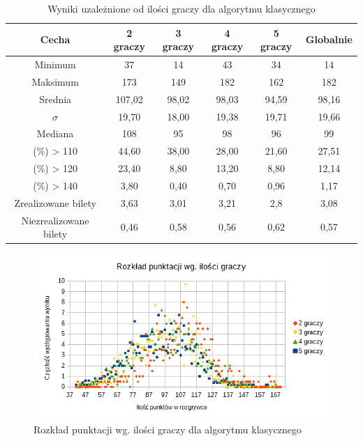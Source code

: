 \documentclass[12pt, oneside]{report}
\begin{document}
\begin{table}[h]
	\begin{center}
		\begin{tabular}{| c | c | c | c | c | c |} \hline
			Cecha & 2 graczy & 3 graczy & 4 graczy & 5 graczy & Globalnie \\ \hline
			Minimum & 37 & 14 & 43 & 34 & 14 \\ \hline
			Maksimum & 173 & 149 & 182 & 162 & 182 \\ \hline
			Srednia & 107,02 & 98,02 & 98,03 & 94,59 & 98,16 \\ \hline
			\begin{math}
				\sigma
			\end{math}
			 & 19,70 & 18,00 & 19,38 & 19,71 & 19,66 \\ \hline
			Mediana & 108 & 95 & 98 & 96 & 99 \\ \hline
			(\%) > 110 & 44,60 & 38,00 & 28,00 & 21,60 & 27,51 \\ \hline
			(\%) > 120 & 23,40 & 8,80 & 13,20 & 8,80 & 12,14 \\ \hline
			(\%) > 140 & 3,80 & 0,40 & 0,70 & 0,96 & 1,17 \\ \hline
			Zrealizowane bilety & 3,63 & 3,01 & 3,21 & 2,8 & 3,08 \\ \hline
			Niezrealizowane bilety & 0,46 & 0,58 & 0,56 & 0,62 & 0,57 \\ \hline
		\end{tabular}
		\caption{Wyniki uzależnione od ilości graczy dla algorytmu klasycznego}
		\label{table:algo_sizeresult}
	\end{center}
\end{table}

\begin{figure}
	\includegraphics[height=0.45\textheight,width=\textwidth]{Wykrespunktow.png}
	\caption{Rozkład punktacji wg. ilości graczy dla algorytmu klasycznego}
	\label{figure:player_points_algo}
\end{figure}
\end{document}
